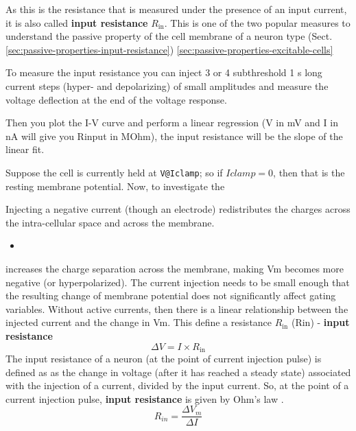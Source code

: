 As this is the resistance that is measured under the presence of an input
current, it is also called {\bf input resistance} $R_\text{in}$. This is one of
the two popular measures to understand the passive property of the cell membrane
of a neuron type (Sect.\ref{sec:passive-properties-input-resistance})
\ref{sec:passive-properties-excitable-cells}
\begin{mdframed}
  
To measure the input resistance you can inject 3 or 4 subthreshold  1 s long
current steps (hyper- and depolarizing) of small amplitudes and measure the
voltage deflection at the end of the voltage response.
  
Then you plot the I-V curve and perform a linear regression (V in mV and I in
nA will give you Rinput in MOhm), the input resistance will be the slope of
the linear fit.
  
\end{mdframed}

Suppose the cell is currently held at \verb!V@Iclamp!; so if $Iclamp=0$, then
that is the resting membrane potential. Now, to investigate the 

Injecting a negative current (though an electrode) redistributes the charges
across the intra-cellular space and across the membrane.
\begin{itemize}
  \item 
\end{itemize}

increases the charge
separation across the membrane, making Vm becomes more negative (or
hyperpolarized). The current injection needs to be small enough that the
resulting change of membrane potential does not significantly affect gating
variables. Without active currents, then there is a linear relationship between
the injected current and the change in Vm. This define a resistance
$R_\text{in}$ (Rin) - {\bf input resistance}
\begin{equation}
\Delta V = I \times R_\text{in}
\end{equation}
The input resistance of a neuron (at the point of current injection pulse) is
defined as as the change in voltage (after it has reached a steady state)
associated with the injection of a current, divided by the input current.
So, at the point of a current injection pulse, {\bf input resistance} is given
by Ohm's law .
\begin{equation}
R_{in} = \frac{\Delta V_m}{\Delta I}
\end{equation}

